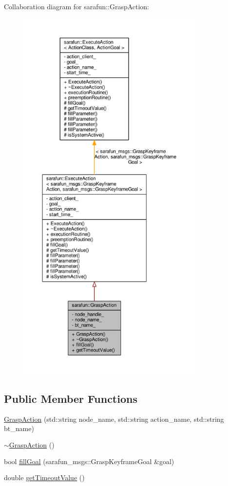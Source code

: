 Collaboration diagram for sarafun\-:\-:Grasp\-Action\-:\nopagebreak
\begin{figure}[H]
\begin{center}
\leavevmode
\includegraphics[height=550pt]{d0/dab/classsarafun_1_1GraspAction__coll__graph}
\end{center}
\end{figure}
\subsection*{Public Member Functions}
\begin{DoxyCompactItemize}
\item 
\hyperlink{classsarafun_1_1GraspAction_ae3eed6fe11388023bab8316803759ac5_ae3eed6fe11388023bab8316803759ac5}{Grasp\-Action} (std\-::string node\-\_\-name, std\-::string action\-\_\-name, std\-::string bt\-\_\-name)
\item 
\hyperlink{classsarafun_1_1GraspAction_aeb09ce6ab575e2653bfb88aa62b09361_aeb09ce6ab575e2653bfb88aa62b09361}{$\sim$\-Grasp\-Action} ()
\item 
bool \hyperlink{classsarafun_1_1GraspAction_a7418fe9de5024a8fbbfe8e5f5336d66f_a7418fe9de5024a8fbbfe8e5f5336d66f}{fill\-Goal} (sarafun\-\_\-msgs\-::\-Grasp\-Keyframe\-Goal \&goal)
\item 
double \hyperlink{classsarafun_1_1GraspAction_a406d5c86b5f788537c5af9d125724a55_a406d5c86b5f788537c5af9d125724a55}{get\-Timeout\-Value} ()
\end{DoxyCompactItemize}
